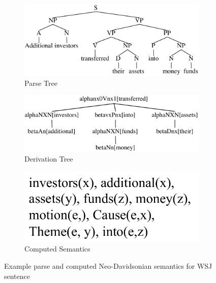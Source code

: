 \documentclass[11pt,a4paper]{article}
\begin{document}
\begin{figure}[h]
    \centering
    \begin{subfigure}{0.6\textwidth}
        \centering
        \includegraphics[width=1.0 \linewidth ]{resources/ch5_resources/parse_example.pdf}
        \caption{Parse Tree}
        \hfill
        \hfill
    \end{subfigure}
    \begin{subfigure}{0.6\textwidth}
        \centering
        \includegraphics[width=1.0 \linewidth ]{resources/ch5_resources/deriv_example.pdf}
        \caption{Derivation Tree}
    \end{subfigure}
    \begin{subfigure}{0.3\textwidth}
        \centering
        \includegraphics[width=1.0 \linewidth ]{resources/ch5_resources/derivation_semantics.pdf}
        \caption{Computed Semantics}
    \end{subfigure}
    \centering
    \caption{Example parse and computed Neo-Davidsonian semantics for WSJ sentence}
    \label{fig:neo_wsj_example}
\end{figure}
\end{document}
